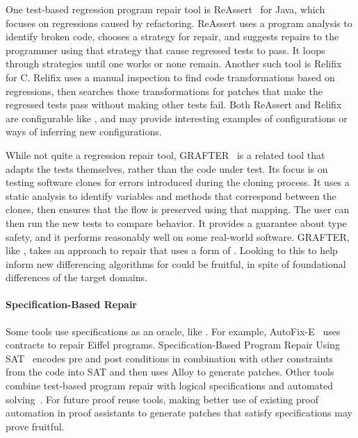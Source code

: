 One test-based regression program repair tool is ReAssert~\cite{daniel2009reassert} for Java,
which focuses on regressions caused by refactoring.
ReAssert uses a program analysis to identify broken code,
chooses a strategy for repair, and suggests repairs to the programmer using that strategy that cause regressed tests to pass.
It loops through strategies until one works or none remain.
Another such tool is Relifix~\cite{Tan:2015:RAR:2818754.2818813} for C.
Relifix uses a manual inspection to find code transformations based on regressions, then searches those transformations for 
patches that make the regressed tests pass without making other tests fail.
Both ReAssert and Relifix are configurable like \toolnamec, and may provide interesting examples of configurations
or ways of inferring new configurations.

While not quite a regression repair tool, GRAFTER~\cite{Zhang:2017:ATD:3097368.3097448} is a related tool that adapts the tests themselves,
rather than the code under test. Its focus is on testing software clones for errors introduced during the
cloning process. It uses a static analysis to identify variables and methods that correspond between the clones,
then ensures that the flow is preserved using that mapping. The user can then run the new tests to compare behavior.
It provides a guarantee about type safety, and it performs reasonably well on some real-world software.
GRAFTER, like \sysnamelong, takes an approach to repair that uses a form of .
Looking to this to help inform new differencing algorithms for \sysnamelong could be fruitful,
in spite of foundational differences of the target domains.

\paragraph{Specification-Based Repair}
Some tools use specifications as an oracle, like \sysnamelong.
For example, AutoFix-E~\cite{Wei:2010:AFP:1831708.1831716, pei2014automated} uses contracts to repair Eiffel programs. 
Specification-Based Program Repair Using SAT~\cite{gopinath2011specification}
encodes pre and post conditions in combination with other constraints from the code 
into SAT and then uses Alloy to generate patches.
Other tools combine test-based program repair with logical specifications and automated solving~\cite{10.1007/978-3-540-24721-0_20, nguyen2013semfix, nguyen2013semfix, Xuan:2017:NAR:3071893.3071964, Mechtaev:2015:DLS:2818754.2818811, Ke:2015:RPS:2916135.2916260}.
For future proof reuse tools, making better use of existing proof automation in proof assistants to generate
patches that satisfy specifications may prove fruitful.

